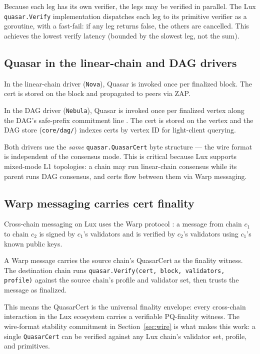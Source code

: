 Because each leg has its own verifier, the legs may be verified in
parallel. The Lux \texttt{quasar.Verify} implementation dispatches
each leg to its primitive verifier as a goroutine, with a fast-fail:
if any leg returns false, the others are cancelled. This achieves
the lowest verify latency (bounded by the slowest leg, not the sum).

\subsection{Quasar in the linear-chain and DAG drivers}

In the linear-chain driver (\texttt{Nova}), Quasar is invoked once
per finalized block. The cert is stored on the block and propagated
to peers via ZAP.

In the DAG driver (\texttt{Nebula}), Quasar is invoked once per
finalized vertex along the DAG's safe-prefix commitment line
\cite{lp020}. The cert is stored on the vertex and the DAG store
(\texttt{core/dag/}) indexes certs by vertex ID for light-client
querying.

Both drivers use the \emph{same} \texttt{quasar.QuasarCert} byte
structure --- the wire format is independent of the consensus mode.
This is critical because Lux supports mixed-mode L1 topologies:
a chain may run linear-chain consensus while its parent runs DAG
consensus, and certs flow between them via Warp messaging.

\subsection{Warp messaging carries cert finality}

Cross-chain messaging on Lux uses the Warp protocol
\cite{quasarcertsoundness,lp075}: a message from chain $c_1$ to
chain $c_2$ is signed by $c_1$'s validators and is verified by
$c_2$'s validators using $c_1$'s known public keys.

A Warp message carries the source chain's QuasarCert as the
finality witness. The destination chain runs
\texttt{quasar.Verify(cert, block, validators, profile)} against the
source chain's profile and validator set, then trusts the message
as finalized.

This means the QuasarCert is the universal finality envelope: every
cross-chain interaction in the Lux ecosystem carries a verifiable
PQ-finality witness. The wire-format stability commitment in
Section~\ref{sec:wire} is what makes this work: a single
\texttt{QuasarCert} can be verified against any Lux chain's
validator set, profile, and primitives.

